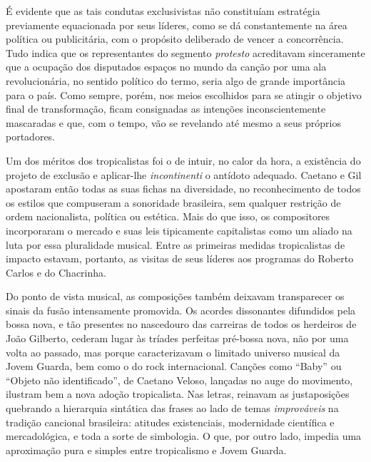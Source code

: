 É evidente que as tais condutas exclusivistas não constituíam estratégia
previamente equacionada por seus líderes, como se dá constantemente na
área política ou publicitária, com o propósito deliberado de vencer a
concorrência. Tudo indica que os representantes do segmento \textit{protesto}
acreditavam sinceramente que a ocupação dos disputados espaços no mundo
da canção por uma ala revolucionária, no sentido político do termo, 
seria algo de grande importância para o país. Como sempre, porém, nos
meios escolhidos para se atingir o objetivo final de transformação,
ficam consignadas as intenções inconscientemente mascaradas e que, com o
tempo, vão se revelando até mesmo a seus próprios portadores.

Um dos méritos dos tropicalistas foi o de intuir, no calor da hora, a
existência do projeto de exclusão e aplicar-lhe \textit{incontinenti} o antídoto
adequado. Caetano e Gil apostaram então todas as suas fichas na
diversidade, no reconhecimento de todos os estilos que compuseram a
sonoridade brasileira, sem qualquer restrição de ordem nacionalista,
política ou estética. Mais do que isso, os compositores incorporaram o
mercado e suas leis tipicamente
capitalistas como um aliado na luta por essa pluralidade musical. Entre
as primeiras medidas tropicalistas de impacto estavam, portanto, as
visitas de seus líderes aos programas do Roberto Carlos e do Chacrinha.

Do ponto de vista musical, as composições também deixavam transparecer
os sinais da fusão intensamente promovida. Os acordes dissonantes
difundidos pela bossa nova, e tão presentes no nascedouro das carreiras
de todos os herdeiros de João Gilberto, cederam lugar às tríades
perfeitas pré-bossa nova, não por uma volta ao passado, mas porque
caracterizavam o limitado universo musical da Jovem Guarda, bem como o
do rock internacional. Canções como ``Baby'' ou ``Objeto não
identificado'', de Caetano Veloso, lançadas no auge do movimento,
ilustram bem a nova adoção tropicalista. Nas letras, reinavam as
justaposições quebrando a hierarquia sintática das frases ao lado de
temas \textit{improváveis} na tradição cancional brasileira: atitudes
existenciais, modernidade científica e mercadológica, e toda a sorte de
simbologia. O que, por outro lado, impedia uma aproximação pura e
simples entre tropicalismo e Jovem Guarda.

